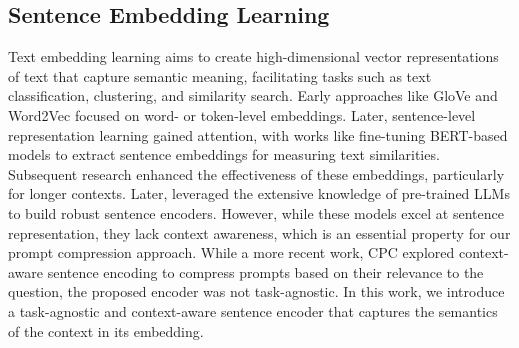 \subsection{Sentence Embedding Learning}
Text embedding learning aims to create high-dimensional vector representations of text that capture semantic meaning, facilitating tasks such as text classification, clustering, and similarity search. Early approaches like GloVe \citep{pennington2014glove} and Word2Vec \citep{church2017word2vec} focused on word- or token-level embeddings. Later, sentence-level representation learning gained attention, with works like \citet{reimers2019sentence} fine-tuning BERT-based models \citep{vaswani2017attention} to extract sentence embeddings for measuring text similarities. Subsequent research \citep{li2023towards, wang2022text, beltagy2020longformer} enhanced the effectiveness of these embeddings, particularly for longer contexts. Later, \citet{behnamghader2024llm2vec} leveraged the extensive knowledge of pre-trained LLMs to build robust sentence encoders. However, while these models excel at sentence representation, they lack context awareness, which is an essential property for our prompt compression approach. While a more recent work, CPC \citep{CPC} explored context-aware sentence encoding to compress prompts based on their relevance to the question, the proposed encoder was not task-agnostic. In this work, we introduce a task-agnostic and context-aware sentence encoder that captures the semantics of the context in its embedding.